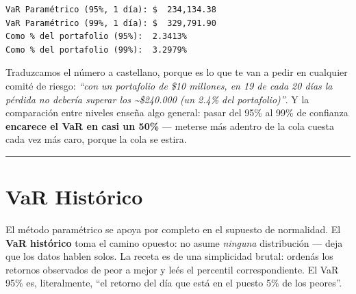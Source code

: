 \documentclass[
  spanish,
  letterpaper,
  DIV=11,
  numbers=noendperiod]{scrreprt}
\newenvironment{Shaded}{\begin{snugshade}}{\end{snugshade}}
\newcommand{\BuiltInTok}[1]{\textcolor[rgb]{0.00,0.23,0.31}{#1}}
\newcommand{\CommentTok}[1]{\textcolor[rgb]{0.37,0.37,0.37}{#1}}
\newcommand{\DecValTok}[1]{\textcolor[rgb]{0.68,0.00,0.00}{#1}}
\newcommand{\NormalTok}[1]{\textcolor[rgb]{0.00,0.23,0.31}{#1}}
\newcommand{\OperatorTok}[1]{\textcolor[rgb]{0.37,0.37,0.37}{#1}}
\newcommand{\SpecialCharTok}[1]{\textcolor[rgb]{0.37,0.37,0.37}{#1}}
\newcommand{\SpecialStringTok}[1]{\textcolor[rgb]{0.13,0.47,0.30}{#1}}
\begin{document}
\begin{verbatim}
VaR Paramétrico (95%, 1 día): $  234,134.38
VaR Paramétrico (99%, 1 día): $  329,791.90
Como % del portafolio (95%):  2.3413%
Como % del portafolio (99%):  3.2979%
\end{verbatim}

Traduzcamos el número a castellano, porque es lo que te van a pedir en
cualquier comité de riesgo: \emph{``con un portafolio de \$10 millones,
en 19 de cada 20 días la pérdida no debería superar los
\textasciitilde\$240.000 (un 2.4\% del portafolio)''}. Y la comparación
entre niveles enseña algo general: pasar del 95\% al 99\% de confianza
\textbf{encarece el VaR en casi un 50\%} --- meterse más adentro de la
cola cuesta cada vez más caro, porque la cola se estira.

\begin{center}\rule{0.5\linewidth}{0.5pt}\end{center}

\chapter{VaR Histórico}\label{var-histuxf3rico}

El método paramétrico se apoya por completo en el supuesto de
normalidad. El \textbf{VaR histórico} toma el camino opuesto: no asume
\emph{ninguna} distribución --- deja que los datos hablen solos. La
receta es de una simplicidad brutal: ordenás los retornos observados de
peor a mejor y leés el percentil correspondiente. El VaR 95\% es,
literalmente, ``el retorno del día que está en el puesto 5\% de los
peores''.

\label{var-historico}
\begin{Shaded}
\end{Shaded}
\end{document}

